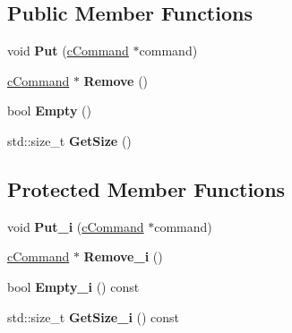 \subsection*{\-Public \-Member \-Functions}
\begin{DoxyCompactItemize}
\item 
\hypertarget{classengine_1_1cCommandQueue_a1d60f01d5e9bd4d17c892257e20b2b89}{void {\bfseries \-Put} (\hyperlink{classengine_1_1cCommand}{c\-Command} $\ast$command)}\label{classengine_1_1cCommandQueue_a1d60f01d5e9bd4d17c892257e20b2b89}

\item 
\hypertarget{classengine_1_1cCommandQueue_a7979f6e2a55a331083c879f4265895f5}{\hyperlink{classengine_1_1cCommand}{c\-Command} $\ast$ {\bfseries \-Remove} ()}\label{classengine_1_1cCommandQueue_a7979f6e2a55a331083c879f4265895f5}

\item 
\hypertarget{classengine_1_1cCommandQueue_a727d36f68de37caba84869e3f973ccbc}{bool {\bfseries \-Empty} ()}\label{classengine_1_1cCommandQueue_a727d36f68de37caba84869e3f973ccbc}

\item 
\hypertarget{classengine_1_1cCommandQueue_af6b95fb876418671d6285ee368abca25}{std\-::size\-\_\-t {\bfseries \-Get\-Size} ()}\label{classengine_1_1cCommandQueue_af6b95fb876418671d6285ee368abca25}

\end{DoxyCompactItemize}
\subsection*{\-Protected \-Member \-Functions}
\begin{DoxyCompactItemize}
\item 
\hypertarget{classengine_1_1cCommandQueue_a3e66c5c4390594c00276229ddf2d3e39}{void {\bfseries \-Put\-\_\-i} (\hyperlink{classengine_1_1cCommand}{c\-Command} $\ast$command)}\label{classengine_1_1cCommandQueue_a3e66c5c4390594c00276229ddf2d3e39}

\item 
\hypertarget{classengine_1_1cCommandQueue_acaee2664e59c4e91aeeac18066df9716}{\hyperlink{classengine_1_1cCommand}{c\-Command} $\ast$ {\bfseries \-Remove\-\_\-i} ()}\label{classengine_1_1cCommandQueue_acaee2664e59c4e91aeeac18066df9716}

\item 
\hypertarget{classengine_1_1cCommandQueue_a7c8a6bd8dae5c050634cededcb77ef4d}{bool {\bfseries \-Empty\-\_\-i} () const }\label{classengine_1_1cCommandQueue_a7c8a6bd8dae5c050634cededcb77ef4d}

\item 
\hypertarget{classengine_1_1cCommandQueue_a2b729f6d9866c6e9b50e142f7e475b05}{std\-::size\-\_\-t {\bfseries \-Get\-Size\-\_\-i} () const }\label{classengine_1_1cCommandQueue_a2b729f6d9866c6e9b50e142f7e475b05}

\end{DoxyCompactItemize}
